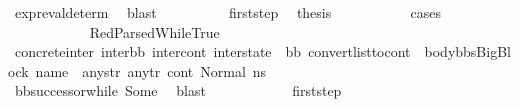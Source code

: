 \begin{isabellebody}
\ expr{\isacharunderscore}{\kern0pt}eval{\isacharunderscore}{\kern0pt}determ\ \isamarkupfalse%
\ blast\isanewline
\isanewline
\ \ \ \ \ \ \ \ \isamarkupfalse%
\ first{\isacharunderscore}{\kern0pt}step\ \isamarkupfalse%
\ {\isacharquery}{\kern0pt}thesis\ \isanewline
\ \ \ \ \ \ \ \ \isamarkupfalse%
\ cases\isanewline
\ \ \ \ \ \ \ \ \ \ \isamarkupfalse%
\ RedParsedWhileTrue\isanewline
\ \ \ \ \ \ \ \ \ \ \isamarkupfalse%
\ concrete{\isacharunderscore}{\kern0pt}inter{}{\isacharcolon}{\kern0pt}\ {\isachardoublequoteopen}{\isacharparenleft}{\kern0pt}inter{\isacharunderscore}{\kern0pt}bb{\isacharcomma}{\kern0pt}\ inter{\isacharunderscore}{\kern0pt}cont{\isacharcomma}{\kern0pt}\ inter{\isacharunderscore}{\kern0pt}state{\isacharparenright}{\kern0pt}\ {\isacharequal}{\kern0pt}\ {\isacharparenleft}{\kern0pt}bb{}{\isacharcomma}{\kern0pt}\ convert{\isacharunderscore}{\kern0pt}list{\isacharunderscore}{\kern0pt}to{\isacharunderscore}{\kern0pt}cont\ {\isacharparenleft}{\kern0pt}{\isacharparenleft}{\kern0pt}\ body{\isacharunderscore}{\kern0pt}bbs{\isacharparenright}{\kern0pt}{\isacharat}{\kern0pt}{\isacharbrackleft}{\kern0pt}{\isacharparenleft}{\kern0pt}BigBlock\ name\ {\isacharbrackleft}{\kern0pt}{\isacharbrackright}{\kern0pt}\ any{\isacharunderscore}{\kern0pt}str\ any{\isacharunderscore}{\kern0pt}tr{\isacharparenright}{\kern0pt}{\isacharbrackright}{\kern0pt}{\isacharparenright}{\kern0pt}\ {\isacharparenleft}{\kern0pt}cont{}{\isacharparenright}{\kern0pt}{\isacharcomma}{\kern0pt}\ {\isacharparenleft}{\kern0pt}Normal\ ns{}{\isacharparenright}{\kern0pt}{\isacharparenright}{\kern0pt}{\isachardoublequoteclose}\isanewline
\ \ \ \ \ \ \ \ \ \ \ \ \isamarkupfalse%
\ bb{\isacharunderscore}{\kern0pt}successor{\isacharunderscore}{\kern0pt}while\ Some\ \isamarkupfalse%
\ blast\isanewline
\isanewline
\ \ \ \ \ \ \ \ \ \ \isamarkupfalse%
\ first{\isacharunderscore}{\kern0pt}step\isanewline
\ \ \ \ \ \ \ \ \ \ \isamarkupfalse%

\end{isabellebody}

